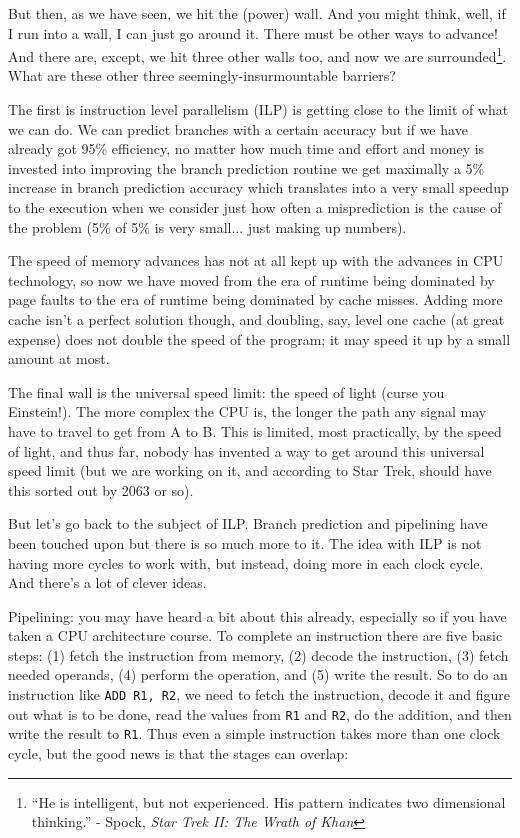 \documentclass[a4paper]{report}
\begin{document}
But then, as we have seen, we hit the (power) wall. And you might think, well, if I run into a wall, I can just go around it. There must be other ways to advance! And there are, except, we hit three other walls too, and now we are surrounded\footnote{``He is intelligent, but not experienced. His pattern indicates two dimensional thinking.'' - Spock, \textit{Star Trek II: The Wrath of Khan}}. What are these other three seemingly-insurmountable barriers?

The first is instruction level parallelism (ILP) is getting close to the limit of what we can do. We can predict branches with a certain accuracy but if we have already got 95\% efficiency, no matter how much time and effort and money is invested into improving the branch prediction routine we get maximally a 5\% increase in branch prediction accuracy which translates into a very small speedup to the execution when we consider just how often a misprediction is the cause of the problem (5\% of 5\% is very small... just making up numbers).

The speed of memory advances has not at all kept up with the advances in CPU technology, so now we have moved from the era of runtime being dominated by page faults to the era of runtime being dominated by cache misses. Adding more cache isn't a perfect solution though, and doubling, say, level one cache (at great expense) does not double the speed of the program; it may speed it up by a small amount at most. 

The final wall is the universal speed limit: the speed of light (curse you Einstein!). The more complex the CPU is, the longer the path any signal may have to travel to get from A to B. This is limited, most practically, by the speed of light, and thus far, nobody has invented a way to get around this universal speed limit (but we are working on it, and according to Star Trek, should have this sorted out by 2063 or so).

But let's go back to the subject of ILP. Branch prediction and pipelining have been touched upon but there is so much more to it. The idea with ILP is not having more cycles to work with, but instead, doing more in each clock cycle. And there's a lot of clever ideas. 

Pipelining: you may have heard a bit about this already, especially so if you have taken a CPU architecture course. To complete an instruction there are five basic steps: (1) fetch the instruction from memory, (2) decode the instruction, (3) fetch needed operands, (4) perform the operation, and (5) write the result. So to do an instruction like \texttt{ADD R1, R2}, we need to fetch the instruction, decode it and figure out what is to be done, read the values from \texttt{R1} and \texttt{R2}, do the addition, and then write the result to \texttt{R1}. Thus even a simple instruction takes more than one clock cycle, but the good news is that the stages can overlap:
\end{document}
